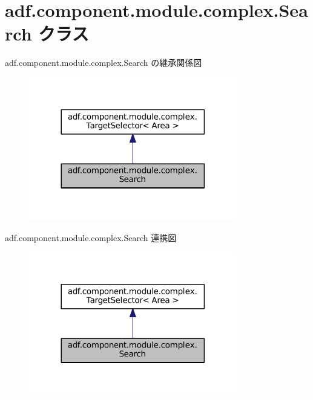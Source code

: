 \hypertarget{classadf_1_1component_1_1module_1_1complex_1_1Search}{}\section{adf.\+component.\+module.\+complex.\+Search クラス}
\label{classadf_1_1component_1_1module_1_1complex_1_1Search}


adf.\+component.\+module.\+complex.\+Search の継承関係図
\nopagebreak
\begin{figure}[H]
\begin{center}
\leavevmode
\includegraphics[width=257pt]{classadf_1_1component_1_1module_1_1complex_1_1Search__inherit__graph}
\end{center}
\end{figure}


adf.\+component.\+module.\+complex.\+Search 連携図
\nopagebreak
\begin{figure}[H]
\begin{center}
\leavevmode
\includegraphics[width=257pt]{classadf_1_1component_1_1module_1_1complex_1_1Search__coll__graph}
\end{center}
\end{figure}
